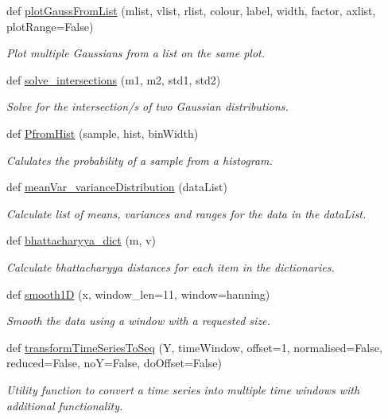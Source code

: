 \begin{DoxyCompactItemize}
def \hyperlink{group__icubclient__SAM__utils_gaf5214036730562004563e7c122e65998}{plot\+Gauss\+From\+List} (mlist, vlist, rlist, colour, label, width, factor, axlist, plot\+Range=False)
\begin{DoxyCompactList}\small\item\em Plot multiple Gaussians from a list on the same plot. \end{DoxyCompactList}\item 
def \hyperlink{group__icubclient__SAM__utils_gab49784000971804130fa10c1e3ad817d}{solve\+\_\+intersections} (m1, m2, std1, std2)
\begin{DoxyCompactList}\small\item\em Solve for the intersection/s of two Gaussian distributions. \end{DoxyCompactList}\item 
def \hyperlink{group__icubclient__SAM__utils_ga36c10c3281fd9c5aa4aeacacc693ee71}{Pfrom\+Hist} (sample, hist, bin\+Width)
\begin{DoxyCompactList}\small\item\em Calulates the probability of a sample from a histogram. \end{DoxyCompactList}\item 
def \hyperlink{group__icubclient__SAM__utils_ga82624221423212408df437771ccbd026}{mean\+Var\+\_\+variance\+Distribution} (data\+List)
\begin{DoxyCompactList}\small\item\em Calculate list of means, variances and ranges for the data in the data\+List. \end{DoxyCompactList}\item 
def \hyperlink{group__icubclient__SAM__utils_ga9f9e9fc5c10660319b4d78dcb1a04d10}{bhattacharyya\+\_\+dict} (m, v)
\begin{DoxyCompactList}\small\item\em Calculate bhattacharyya distances for each item in the dictionaries. \end{DoxyCompactList}\item 
def \hyperlink{group__icubclient__SAM__utils_ga993c63ecfc9099d2e2ccd42282354de5}{smooth1D} (x, window\+\_\+len=11, window=\textquotesingle{}hanning\textquotesingle{})
\begin{DoxyCompactList}\small\item\em Smooth the data using a window with a requested size. \end{DoxyCompactList}\item 
def \hyperlink{group__icubclient__SAM__utils_ga54c327e56dfec748f1c4a150b9180162}{transform\+Time\+Series\+To\+Seq} (Y, time\+Window, offset=1, normalised=False, reduced=False, noY=False, do\+Offset=False)
\begin{DoxyCompactList}\small\item\em Utility function to convert a time series into multiple time windows with additional functionality. \end{DoxyCompactList}\end{DoxyCompactItemize}
